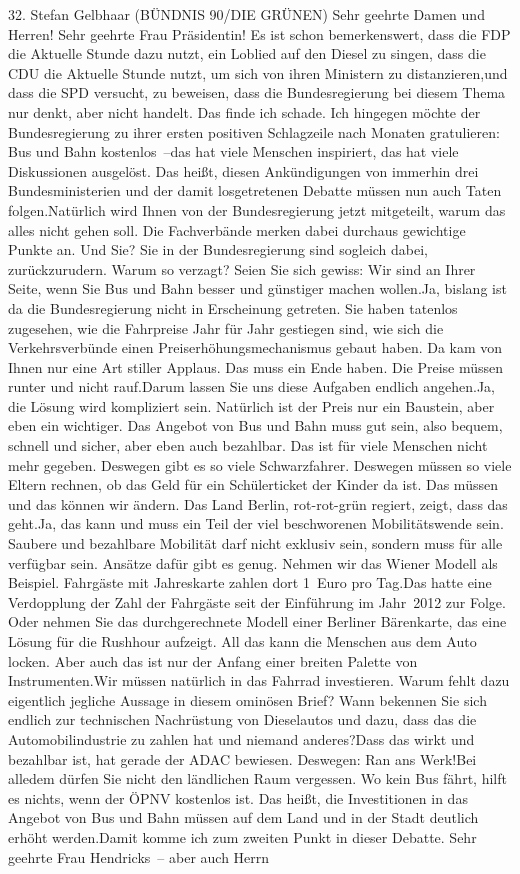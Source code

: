 \documentclass{article}
\begin{document}
	32. Stefan Gelbhaar (BÜNDNIS 90/DIE GRÜNEN) Sehr geehrte Damen und Herren! Sehr geehrte Frau Präsidentin! Es ist schon bemerkenswert, dass die FDP die Aktuelle Stunde dazu nutzt, ein Loblied auf den Diesel zu singen, dass die CDU die Aktuelle Stunde nutzt, um sich von ihren Ministern zu distanzieren,und dass die SPD versucht, zu beweisen, dass die Bundesregierung bei diesem Thema nur denkt, aber nicht handelt. Das finde ich schade. Ich hingegen möchte der Bundesregierung zu ihrer ersten positiven Schlagzeile nach Monaten gratulieren: Bus und Bahn kostenlos –das hat viele Menschen inspiriert, das hat viele Diskussionen ausgelöst. Das heißt, diesen Ankündigungen von immerhin drei Bundesministerien und der damit losgetretenen Debatte müssen nun auch Taten folgen.Natürlich wird Ihnen von der Bundesregierung jetzt mitgeteilt, warum das alles nicht gehen soll. Die Fachverbände merken dabei durchaus gewichtige Punkte an. Und Sie? Sie in der Bundesregierung sind sogleich dabei, zurückzurudern. Warum so verzagt? Seien Sie sich gewiss: Wir sind an Ihrer Seite, wenn Sie Bus und Bahn besser und günstiger machen wollen.Ja, bislang ist da die Bundesregierung nicht in Erscheinung getreten. Sie haben tatenlos zugesehen, wie die Fahrpreise Jahr für Jahr gestiegen sind, wie sich die Verkehrsverbünde einen Preiserhöhungsmechanismus gebaut haben. Da kam von Ihnen nur eine Art stiller Applaus. Das muss ein Ende haben. Die Preise müssen runter und nicht rauf.Darum lassen Sie uns diese Aufgaben endlich angehen.Ja, die Lösung wird kompliziert sein. Natürlich ist der Preis nur ein Baustein, aber eben ein wichtiger. Das Angebot von Bus und Bahn muss gut sein, also bequem, schnell und sicher, aber eben auch bezahlbar. Das ist für viele Menschen nicht mehr gegeben. Deswegen gibt es so viele Schwarzfahrer. Deswegen müssen so viele Eltern rechnen, ob das Geld für ein Schülerticket der Kinder da ist. Das müssen und das können wir ändern. Das Land Berlin, rot-rot-grün regiert, zeigt, dass das geht.Ja, das kann und muss ein Teil der viel beschworenen Mobilitätswende sein. Saubere und bezahlbare Mobilität darf nicht exklusiv sein, sondern muss für alle verfügbar sein. Ansätze dafür gibt es genug. Nehmen wir das Wiener Modell als Beispiel. Fahrgäste mit Jahreskarte zahlen dort 1 Euro pro Tag.Das hatte eine Verdopplung der Zahl der Fahrgäste seit der Einführung im Jahr 2012 zur Folge. Oder nehmen Sie das durchgerechnete Modell einer Berliner Bärenkarte, das eine Lösung für die Rushhour aufzeigt. All das kann die Menschen aus dem Auto locken. Aber auch das ist nur der Anfang einer breiten Palette von Instrumenten.Wir müssen natürlich in das Fahrrad investieren. Warum fehlt dazu eigentlich jegliche Aussage in diesem ominösen Brief? Wann bekennen Sie sich endlich zur technischen Nachrüstung von Dieselautos und dazu, dass das die Automobilindustrie zu zahlen hat und niemand anderes?Dass das wirkt und bezahlbar ist, hat gerade der ADAC bewiesen. Deswegen: Ran ans Werk!Bei alledem dürfen Sie nicht den ländlichen Raum vergessen. Wo kein Bus fährt, hilft es nichts, wenn der ÖPNV kostenlos ist. Das heißt, die Investitionen in das Angebot von Bus und Bahn müssen auf dem Land und in der Stadt deutlich erhöht werden.Damit komme ich zum zweiten Punkt in dieser Debatte. Sehr geehrte Frau Hendricks – aber auch Herrn 
\end{document}
